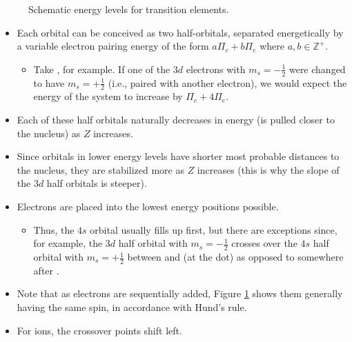 \documentclass[../main.tex]{subfiles}
\begin{document}
\begin{itemize}
\begin{figure}[h!]
        \caption{Schematic energy levels for transition elements.}
        \label{fig:transitionEnergyLevels}
    \end{figure}
    \begin{itemize}
        \item Each orbital can be conceived as two half-orbitals, separated energetically by a variable electron pairing energy of the form $a\Pi_c+b\Pi_e$ where $a,b\in\mathbb{Z}^+$.
        \begin{itemize}
            \item Take , for example. If one of the $3d$ electrons with $m_s=-\frac{1}{2}$ were changed to have $m_s=+\frac{1}{2}$ (i.e., paired with another electron), we would expect the energy of the system to increase by $\Pi_c+4\Pi_e$.
        \end{itemize}
        \item Each of these half orbitals naturally decreases in energy (is pulled closer to the nucleus) as $Z$ increases.
        \item Since orbitals in lower energy levels have shorter most probable distances to the nucleus, they are stabilized more as $Z$ increases (this is why the slope of the $3d$ half orbitals is steeper).
        \item Electrons are placed into the lowest energy positions possible.
        \begin{itemize}
            \item Thus, the $4s$ orbital usually fills up first, but there are exceptions since, for example, the $3d$ half orbital with $m_s=-\frac{1}{2}$ crosses over the $4s$ half orbital with $m_s=+\frac{1}{2}$ between  and  (at the dot) as opposed to somewhere after .
        \end{itemize}
        \item Note that as electrons are sequentially added, Figure \ref{fig:transitionEnergyLevels} shows them generally having the same spin, in accordance with Hund's rule.
        \item For ions, the crossover points shift left.
        \begin{itemize}

\end{itemize}
\end{itemize}
\end{itemize}
\end{document}
